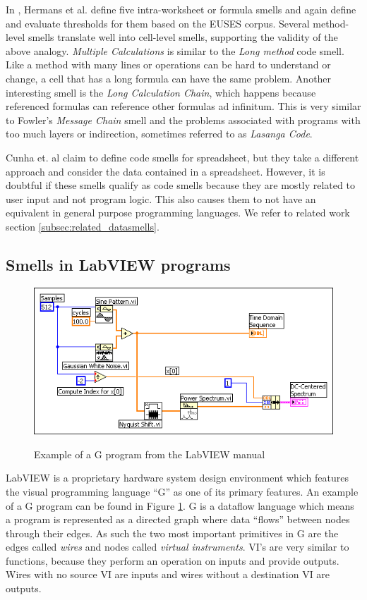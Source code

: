\documentclass[10pt,conference,compsocconf]{IEEEtran}
\begin{document}
In \cite{Hermans2012intra}, Hermans et al. define five intra-worksheet or formula smells and again define and evaluate thresholds for them based on the EUSES corpus.
Several method-level smells translate well into cell-level smells, supporting the validity of the above analogy.
\textit{Multiple Calculations} is similar to the \textit{Long method} code smell.
Like a method with many lines or operations can be hard to understand or change, a cell that has a long formula can have the same problem.
Another interesting smell is the \textit{Long Calculation Chain}, which happens because referenced formulas can reference other formulas ad infinitum.
This is very similar to Fowler's \textit{Message Chain} smell and the problems associated with programs with too much layers or indirection, sometimes referred to as \textit{Lasanga Code}.

Cunha et. al \cite{cunha2012towards} claim to define code smells for spreadsheet, but they take a different approach and  consider the data contained in a spreadsheet.
However, it is doubtful if these smells qualify as code smells because they are mostly related to user input and not program logic.
This also causes them to not have an equivalent in general purpose programming languages.
We refer to related work section \ref{subsec:related_datasmells}.

\subsection{Smells in LabVIEW programs}

\begin{figure}
\caption{Example of a G program from the LabVIEW manual}
\centering
\includegraphics[width=\columnwidth]{labview-1}
\label{fig:labviewexample}
\end{figure}

LabVIEW is a proprietary hardware system design environment which features the visual programming language ``G'' as one of its primary features.
An example of a G program can be found in Figure \ref{fig:labviewexample}.
G is a dataflow language which means a program is represented as a directed graph where data ``flows'' between nodes through their edges.
As such the two most important primitives in G are the edges called \textit{wires} and nodes called \textit{virtual instruments}.
VI's are very similar to functions, because they perform an operation on inputs and provide outputs.
Wires with no source VI are inputs and wires without a destination VI are outputs. 
\end{document}
